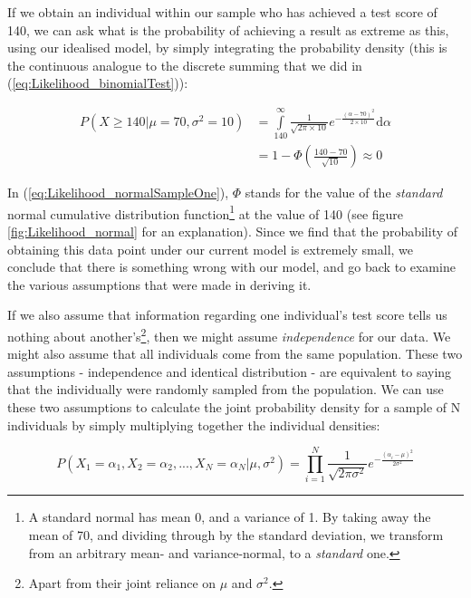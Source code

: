 \documentclass[11pt,fullpage]{book}
\begin{document}
If we obtain an individual within our sample who has achieved a test score of 140, we can ask what is the probability of achieving a result as extreme as this, using our idealised model, by simply integrating the probability density (this is the continuous analogue to the discrete summing that we did in (\ref{eq:Likelihood_binomialTest})):

\begin{equation}
\begin{align}
P(X\geq 140|\mu=70,\sigma^2=10) &= \int\limits_{140}^{\infty}\frac{1}{\sqrt{2\pi\times 10}}e^{-\frac{(\alpha-70)^2}{2\times 10}} \mathrm{d}\alpha\\
 & = 1-\Phi\left(\frac{140-70}{\sqrt{10}}\right) \approx 0
\end{align}\label{eq:Likelihood_normalSampleOne}
\end{equation}

In (\ref{eq:Likelihood_normalSampleOne}), $\Phi$ stands for the value of the \textit{standard} normal cumulative distribution function\footnote{A standard normal has mean 0, and a variance of 1. By taking away the mean of 70, and dividing through by the standard deviation, we transform from an arbitrary mean- and variance-normal, to a \textit{standard} one.} at the value of 140 (see figure \ref{fig:Likelihood_normal} for an explanation). Since we find that the probability of obtaining this data point under our current model is extremely small, we conclude that there is something wrong with our model, and go back to examine the various assumptions that were made in deriving it.

If we also assume that information regarding one individual's test score tells us nothing about another's\footnote{Apart from their joint reliance on $\mu$ and $\sigma^2$.}, then we might assume \textit{independence} for our data. We might also assume that all individuals come from the same population.  These two assumptions - independence and identical distribution - are equivalent to saying that the individually were randomly sampled from the population. We can use these two assumptions to calculate the joint probability density for a sample of N individuals by simply multiplying together the individual densities:


\begin{equation}
P(X_1=\alpha_1,X_2 =\alpha_2,...,X_N=\alpha_N|\mu,\sigma^2) = \prod\limits_{i=1}^{N}\frac{1}{\sqrt{2\pi\sigma^2}}e^{-\frac{(\alpha_i-\mu)^2}{2\sigma^2}}
\end{equation}\label{eq:Likelihood_normalN}
\end{document}
